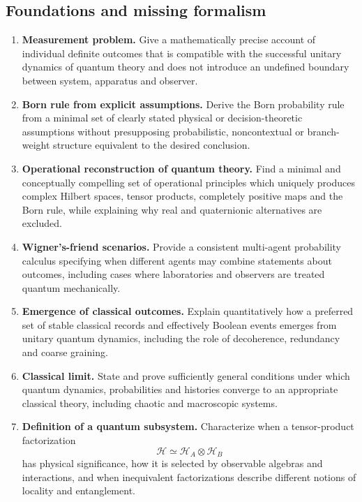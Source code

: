 \documentclass{article}
\begin{document}
\subsection{Foundations and missing formalism}

\begin{enumerate}[label=\textbf{F\arabic*.},leftmargin=*]

\item \formalism{} \textbf{Measurement problem.}
Give a mathematically precise account of individual definite outcomes
that is compatible with the successful unitary dynamics of quantum
theory and does not introduce an undefined boundary between system,
apparatus and observer.

\item \formalism{} \textbf{Born rule from explicit assumptions.}
Derive the Born probability rule from a minimal set of clearly stated
physical or decision-theoretic assumptions without presupposing
probabilistic, noncontextual or branch-weight structure equivalent to
the desired conclusion.

\item \formalism{} \textbf{Operational reconstruction of quantum theory.}
Find a minimal and conceptually compelling set of operational
principles which uniquely produces complex Hilbert spaces, tensor
products, completely positive maps and the Born rule, while explaining
why real and quaternionic alternatives are excluded.

\item \formalism{} \textbf{Wigner's-friend scenarios.}
Provide a consistent multi-agent probability calculus specifying when
different agents may combine statements about outcomes, including
cases where laboratories and observers are treated quantum
mechanically.

\item \formalism{} \textbf{Emergence of classical outcomes.}
Explain quantitatively how a preferred set of stable classical records
and effectively Boolean events emerges from unitary quantum dynamics,
including the role of decoherence, redundancy and coarse graining.

\item \formalism{} \textbf{Classical limit.}
State and prove sufficiently general conditions under which quantum
dynamics, probabilities and histories converge to an appropriate
classical theory, including chaotic and macroscopic systems.

\item \formalism{} \textbf{Definition of a quantum subsystem.}
Characterize when a tensor-product factorization
\[
    \mathcal H\simeq\mathcal H_A\otimes\mathcal H_B
\]
has physical significance, how it is selected by observable algebras
and interactions, and when inequivalent factorizations describe
different notions of locality and entanglement.


\end{enumerate}
\end{document}

